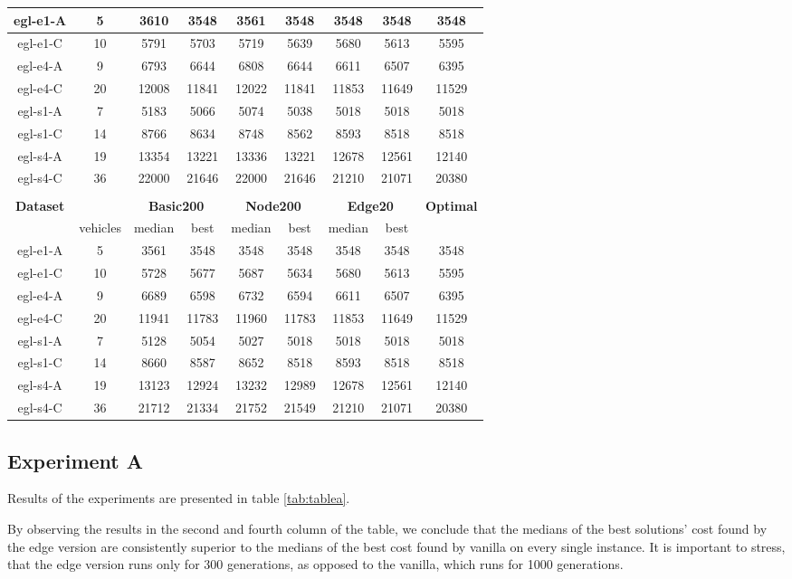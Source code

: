 \documentclass[twoside]{ctuthesis}
\theoremstyle{plain}
\theoremstyle{definition}
\theoremstyle{note}
\begin{document}
\begin{table}[htbp]
\begin{tabular}{|c|c|cc|cc|cc|c|}
		egl-e1-A &5&3610&3548&3561&3548&3548&3548&3548\\ \hline
		egl-e1-C &10&5791&5703&5719&5639&5680&5613&5595\\ \hline
		egl-e4-A &9&6793&6644&6808&6644&6611&6507&6395\\ \hline
		egl-e4-C &20&12008&11841&12022&11841&11853&11649&11529\\ \hline
		egl-s1-A &7&5183&5066&5074&5038&5018&5018&5018\\ \hline
		egl-s1-C &14&8766&8634&8748&8562&8593&8518&8518\\ \hline
		egl-s4-A &19&13354&13221&13336&13221&12678&12561&12140\\ \hline
		egl-s4-C &36&22000&21646&22000&21646&21210&21071&20380\\ \hhline{|=========|}
		\multicolumn{9}{|c|}{\textbf{Experiment C}}\\ 
		\multicolumn{1}{|c}{\textbf{Dataset}}&\multicolumn{1}{c}{}&\multicolumn{2}{c}{\textbf{Basic200}}&\multicolumn{2}{c}{\textbf{Node200}}&\multicolumn{2}{c}{\textbf{Edge20}}&\textbf{Optimal} \\ \hline
		&vehicles&median&best&median&best&median&best&\\ \hline
		egl-e1-A&5&3561&3548&3548&3548&3548&3548&3548\\ \hline
		egl-e1-C&10&5728&5677&5687&5634&5680&5613&5595\\ \hline
		egl-e4-A&9&6689&6598&6732&6594&6611&6507&6395\\ \hline
		egl-e4-C&20&11941&11783&11960&11783&11853&11649&11529\\ \hline
		egl-s1-A&7&5128&5054&5027&5018&5018&5018&5018\\ \hline
		egl-s1-C&14&8660&8587&8652&8518&8593&8518&8518\\ \hline
		egl-s4-A&19&13123&12924&13232&12989&12678&12561&12140\\ \hline
		egl-s4-C&36&21712&21334&21752&21549&21210&21071&20380\\ \hline
	\end{tabular}
\end{table}

\subsection{Experiment A}
Results of the experiments are presented in table \ref{tab:tablea}. 


By observing the results in the second and fourth column of the table, we conclude that the medians of the best solutions' cost found by the edge version are consistently superior to the medians of the best cost found by vanilla on every single instance. It is important to stress, that the edge version runs only for 300 generations, as opposed to the vanilla, which runs for 1000 generations. 
\end{document}
